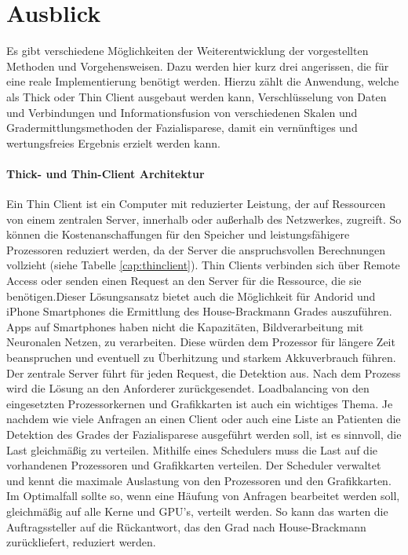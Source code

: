 \section{Ausblick}\label{next}
Es gibt verschiedene Möglichkeiten der Weiterentwicklung der vorgestellten Methoden und Vorgehensweisen. Dazu werden hier kurz drei angerissen, die für eine reale Implementierung benötigt werden. Hierzu zählt die Anwendung, welche als Thick oder Thin Client ausgebaut werden kann, Verschlüsselung von Daten und Verbindungen und Informationsfusion von verschiedenen Skalen und Gradermittlungsmethoden der Fazialisparese, damit ein vernünftiges und wertungsfreies Ergebnis erzielt werden kann.

\paragraph{Thick- und Thin-Client Architektur}\label{client}
Ein Thin Client ist ein Computer mit reduzierter Leistung, der auf Ressourcen von einem zentralen Server, innerhalb oder außerhalb des Netzwerkes, zugreift. So können die Kostenanschaffungen für den Speicher und leistungsfähigere Prozessoren reduziert werden, da der Server die anspruchsvollen Berechnungen vollzieht (siehe Tabelle \ref{cap:thinclient}). Thin Clients verbinden sich über Remote Access oder senden einen Request an den Server für die Ressource, die sie benötigen.Dieser Lösungsansatz bietet auch die Möglichkeit für Andorid und iPhone Smartphones die Ermittlung des House-Brackmann Grades auszuführen. Apps auf Smartphones haben nicht die Kapazitäten, Bildverarbeitung mit Neuronalen Netzen, zu verarbeiten. Diese würden dem Prozessor für längere Zeit beanspruchen und eventuell zu Überhitzung und starkem Akkuverbrauch führen. Der zentrale Server führt für jeden Request, die Detektion aus. Nach dem Prozess wird die Lösung an den Anforderer zurückgesendet. Loadbalancing von den eingesetzten Prozessorkernen und Grafikkarten ist auch ein wichtiges Thema. Je nachdem wie viele Anfragen an einen Client oder auch eine Liste an Patienten die Detektion des Grades der Fazialisparese ausgeführt werden soll, ist es sinnvoll, die Last gleichmäßig zu verteilen. Mithilfe eines Schedulers muss die Last auf die vorhandenen Prozessoren und Grafikkarten verteilen. Der Scheduler verwaltet und kennt die maximale Auslastung von den Prozessoren und den Grafikkarten. Im Optimalfall sollte so, wenn eine Häufung von Anfragen bearbeitet werden soll, gleichmäßig auf alle Kerne und GPU's, verteilt werden. So kann das warten die Auftragssteller auf die Rückantwort, das den Grad nach House-Brackmann zurückliefert, reduziert werden.

